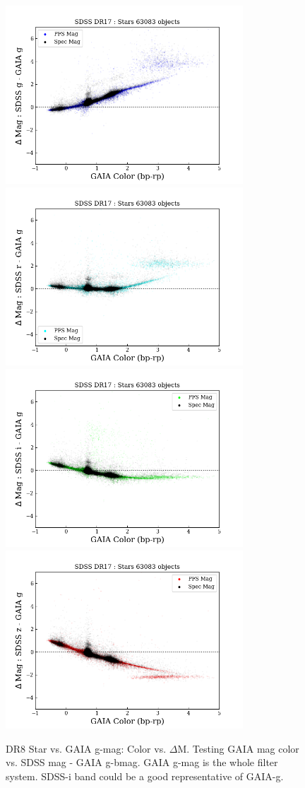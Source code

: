 \documentclass[apj,twocolumn]{aastex631}
\begin{document}
\begin{figure}%
\begin{center}
\includegraphics[angle=0,width=8.9cm]{figures/20220812_color_dmag_g_dr17star.png}
\includegraphics[angle=0,width=8.9cm]{figures/20220812_color_dmag_r_dr17star.png}
\includegraphics[angle=0,width=8.9cm]{figures/20220812_color_dmag_i_dr17star.png}
\includegraphics[angle=0,width=8.9cm]{figures/20220812_color_dmag_z_dr17star.png}
\caption{DR8 Star vs. GAIA g-mag: Color vs. $\Delta$M.  Testing GAIA mag color vs. SDSS mag - GAIA g-bmag.   GAIA g-mag is the whole filter system. SDSS-i band could be a good representative of GAIA-g.}
\end{center}
\end{figure}
\end{document}
